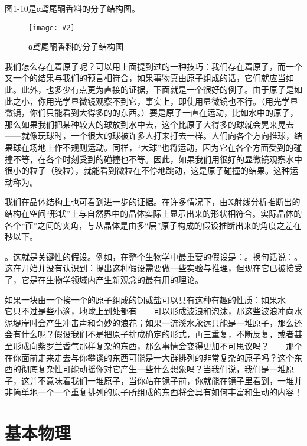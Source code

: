 \documentclass[12pt,oneside]{book}
\newenvironment{fig}[2][1]
{\begin{figure}[H]
\centering
\texttt{[image: \#2]}}
{\end{figure}}
\begin{document}
图1-10是α鸢尾酮香料的分子结构图。
\begin{fig}{α鸢尾酮香料的分子结构图}
\caption{α鸢尾酮香料的分子结构图}
\label{fig:α鸢尾酮香料的分子结构图}
\end{fig}

我们怎么存在着原子呢？可以用上面提到过的一种技巧：我们存在着原子，而一个又一个的结果与我们的预言相符合，如果事物真由原子组成的话，它们就应当如此。此外，也多少有点更为直接的证据，下面就是一个很好的例子。由于原子是如此之小，你用光学显微镜观察不到它，事实上，即使用显微镜也不行。（用光学显微镜，你们只能看到大得多的的东西。）要是原子一直在运动，比如水中的原子，那么如果我们把某种较大的球放到水中去，这个比原子大得多的球就会晃来晃去——就像玩球时，一个很大的球被许多人打来打去一样。人们向各个方向推球，结果球在场地上作不规则运动。同样，“大球”也将运动，因为它在各个方面受到的碰撞不等，在各个时刻受到的碰撞也不等。因此，如果我们用很好的显微镜观察水中很小的粒子（胶粒），就能看到微粒在不停地跳动，这是原子碰撞的结果。这种运动称为。

我们在晶体结构上也可看到进一步的证据。在许多情况下，由X射线分析推断出的结构在空间“形状”上与自然界中的晶体实际上显示出来的形状相符合。实际晶体的各个“面”之间的夹角，与从晶体是由多“层”原子构成的假设推断出来的角度之差在秒以下。

。这就是关键性的假设。例如，在整个生物学中最重要的假设是：。换句话说：。这在开始并没有认识到：提出这种假设需要做一些实验与推理，但现在它已被接受了，它是在生物学领域内产生新观念的最有用的理论。

如果一块由一个挨一个的原子组成的钢或盐可以具有这种有趣的性质：如果水——它只不过是些小滴，地球上到处都有——可以形成波浪和泡沫，那这些波浪冲向水泥堤岸时会产生冲击声和奇妙的浪花；如果一流溪水永远只能是一堆原子，那么还会有什么呢？假设我们不是把原子排成确定的形式，再三重复，不断反复，或者甚至形成向紫罗兰香气那样复杂的东西，那么事情会变得更加不可思议吗？——那个在你面前走来走去与你攀谈的东西可能是一大群排列的非常复杂的原子吗？这个东西的彻底复杂性可能动摇你对它产生一些什么想象吗？当我们说，我们是一堆原子，这并不意味着我们一堆原子，当你站在镜子前，你就能在镜子里看到，一堆并非简单地一个一个重复排列的原子所组成的东西将会具有如何丰富和生动的内容！



\chapter{基本物理}
\end{document}

